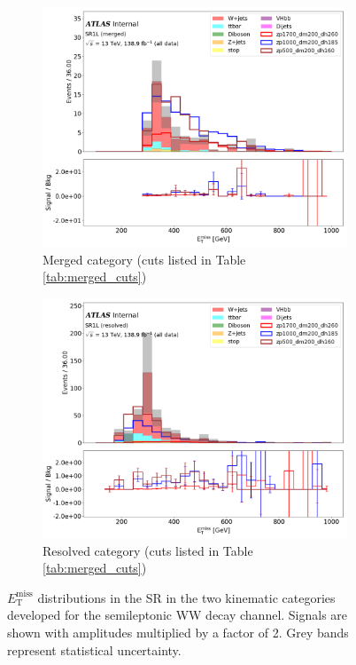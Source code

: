 \documentclass[12pt]{article}
\newcommand*{\met}{\ensuremath{E_\text{T}^\text{miss}} }
\begin{document}
\begin{figure}[H]
     \centering
     \begin{subfigure}[b]{0.49\textwidth}
         \centering
         \includegraphics[width=\textwidth]{figures/MetTST_met_merged.png}
         \caption[]{Merged category (cuts listed in Table \ref{tab:merged_cuts})}
         \label{fig:merged}
     \end{subfigure}
     \hfill
     \begin{subfigure}[b]{0.49\textwidth}
         \centering
         \includegraphics[width=\textwidth]{figures/MetTST_met_resolved.png}
         \caption[]{Resolved category (cuts listed in Table \ref{tab:merged_cuts})}
         \label{fig:resolved}
     \end{subfigure}
\caption[]{\met distributions in the SR in the two kinematic categories developed for the semileptonic WW decay channel. Signals are shown with amplitudes multiplied by a factor of 2. Grey bands represent statistical uncertainty.}
\label{fig:met_categories}
\end{figure}
\end{document}

